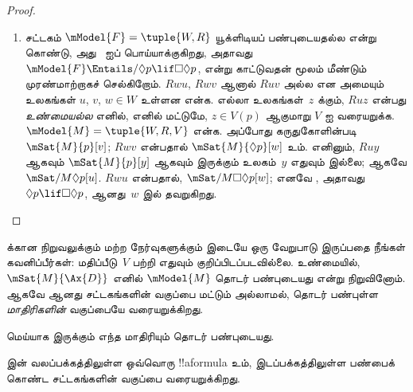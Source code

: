 \documentclass[../../../include/open-logic-section]{subfiles}
\begin{document}
\begin{proof}
\begin{enumerate}
    அதாவது $\mModel{F} \Entails \Box p \lif \Box\Box p$, என்க. $u$, $v$,
    $w \in W$ ஆகியவை $Ruv$, $Rvw$ ஆகும் ஏதேனும் உலகங்களாக இருக்கட்டும்;
    $Ruw$ என்று காட்ட வேண்டும். $Ruz$ எனில், எனில் மட்டுமே, $z \in V(p)$
    ஆகுமாறு $V$ ஐ வரையறுக்க (மற்றபடி $V$ ஏதேனுமாக இருக்கலாம்).
    $\mModel{M} =\tuple{W, R, V}$ என்க. $V$ இன் வரையறைப்படி, $Ruz$ ஆகும்
    எல்லா~$z$ க்கும் $\mSat{M}{p}[z]$; எனவே $\mSat{M}{\Box p}[u]$.
    ஆனால் கருதுகோளின்படி , அதாவது $\Box p \lif \Box \Box p$,
    ஆனது~$u$ இல் மெய்யாகும்; ஆகவே $\mSat{M}{\Box \Box p}[u]$.
    $Ruv$, $Rvw$ என்பதால் $\mSat{M}{p}[w]$; ஆனால்~$V$ இன் வரையறைப்படி
    இது $Ruw$ ஆக இருந்தால் மட்டுமே சாத்தியம்; இதுவே வேண்டியது.
  \item சட்டகம் $\mModel{F} = \tuple{W, R}$ யூக்ளிடியப் பண்புடையதல்ல என்று
    கொண்டு, அது~ ஐப் பொய்யாக்குகிறது, அதாவது $\mModel{F} \Entails/
    \Diamond p \lif \Box\Diamond p$, என்று காட்டுவதன் மூலம் மீண்டும்
    முரண்மாற்றாகச் செல்கிறோம். $Rwu$, $Rwv$ ஆனால் $Ruv$ அல்ல என அமையும்
    உலகங்கள் $u$, $v$, $w \in W$ உள்ளன என்க. எல்லா உலகங்கள்~$z$ க்கும்,
    $Ruz$ என்பது \emph{உண்மையல்ல} எனில், எனில் மட்டுமே, $z \in V(p)$
    ஆகுமாறு $V$ ஐ வரையறுக்க. $\mModel{M} =\tuple{W, R, V}$ என்க.
    அப்போது கருதுகோளின்படி $\mSat{M}{p}[v]$; $Rwv$ என்பதால்
    $\mSat{M}{\Diamond p}[w]$ உம். எனினும், $Ruy$ ஆகவும்
    $\mSat{M}{p}[y]$ ஆகவும் இருக்கும் உலகம்~$y$ எதுவும் இல்லை; ஆகவே
    $\mSat/{M}{\Diamond p}[u]$. $Rwu$ என்பதால்,
    $\mSat/{M}{\Box\Diamond p}[w]$; எனவே , அதாவது $\Diamond p
    \lif \Box\Diamond p$, ஆனது~$w$ இல் தவறுகிறது.
  \end{enumerate}
\end{proof}

 க்கான நிறுவலுக்கும் மற்ற நேர்வுகளுக்கும் இடையே ஒரு வேறுபாடு
இருப்பதை நீங்கள் கவனிப்பீர்கள்: மதிப்பீடு~$V$ பற்றி எதுவும் குறிப்பிடப்படவில்லை.
உண்மையில், $\mSat{M}{\Ax{D}}$ எனில் $\mModel{M}$ தொடர் பண்புடையது என்று
நிறுவினோம். ஆகவே  ஆனது சட்டகங்களின் வகுப்பை மட்டும் அல்லாமல்,
தொடர் பண்புள்ள \emph{மாதிரிகளின்} வகுப்பையே வரையறுக்கிறது.

\begin{cor}
   மெய்யாக இருக்கும் எந்த மாதிரியும் தொடர் பண்புடையது.
\end{cor}

\begin{cor}
 இன் வலப்பக்கத்திலுள்ள ஒவ்வொரு !!a{formula} உம்,
இடப்பக்கத்திலுள்ள பண்பைக் கொண்ட சட்டகங்களின் வகுப்பை வரையறுக்கிறது.
\end{cor}
\end{document}
